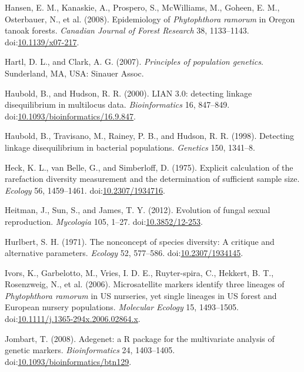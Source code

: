 \documentclass[double,12pt]{beavtex}
\begin{document}
  \hypertarget{ref-hansen2008epidemiology}{}
  Hansen, E. M., Kanaskie, A., Prospero, S., McWilliams, M., Goheen, E.
  M., Osterbauer, N., et al. (2008). Epidemiology of \emph{Phytophthora
  ramorum} in Oregon tanoak forests. \emph{Canadian Journal of Forest
  Research} 38, 1133--1143.
  doi:\href{https://doi.org/10.1139/x07-217}{10.1139/x07-217}.
  
  \hypertarget{ref-hartl1997principles}{}
  Hartl, D. L., and Clark, A. G. (2007). \emph{Principles of population
  genetics}. Sunderland, MA, USA: Sinauer Assoc.
  
  \hypertarget{ref-Haubold:2000}{}
  Haubold, B., and Hudson, R. R. (2000). LIAN 3.0: detecting linkage
  disequilibrium in multilocus data. \emph{Bioinformatics} 16, 847--849.
  doi:\href{https://doi.org/10.1093/bioinformatics/16.9.847}{10.1093/bioinformatics/16.9.847}.
  
  \hypertarget{ref-haubold1998detecting}{}
  Haubold, B., Travisano, M., Rainey, P. B., and Hudson, R. R. (1998).
  Detecting linkage disequilibrium in bacterial populations.
  \emph{Genetics} 150, 1341--8.
  
  \hypertarget{ref-heck1975explicit}{}
  Heck, K. L., van Belle, G., and Simberloff, D. (1975). Explicit
  calculation of the rarefaction diversity measurement and the
  determination of sufficient sample size. \emph{Ecology} 56, 1459--1461.
  doi:\href{https://doi.org/10.2307/1934716}{10.2307/1934716}.
  
  \hypertarget{ref-heitman2012evolution}{}
  Heitman, J., Sun, S., and James, T. Y. (2012). Evolution of fungal
  sexual reproduction. \emph{Mycologia} 105, 1--27.
  doi:\href{https://doi.org/10.3852/12-253}{10.3852/12-253}.
  
  \hypertarget{ref-hurlbert1971nonconcept}{}
  Hurlbert, S. H. (1971). The nonconcept of species diversity: A critique
  and alternative parameters. \emph{Ecology} 52, 577--586.
  doi:\href{https://doi.org/10.2307/1934145}{10.2307/1934145}.
  
  \hypertarget{ref-ivors2006microsatellite}{}
  Ivors, K., Garbelotto, M., Vries, I. D. E., Ruyter-spira, C., Hekkert,
  B. T., Rosenzweig, N., et al. (2006). Microsatellite markers identify
  three lineages of \emph{Phytophthora ramorum} in US nurseries, yet
  single lineages in US forest and European nursery populations.
  \emph{Molecular Ecology} 15, 1493--1505.
  doi:\href{https://doi.org/10.1111/j.1365-294x.2006.02864.x}{10.1111/j.1365-294x.2006.02864.x}.
  
  \hypertarget{ref-Jombart_2008}{}
  Jombart, T. (2008). Adegenet: a R package for the multivariate analysis
  of genetic markers. \emph{Bioinformatics} 24, 1403--1405.
  doi:\href{https://doi.org/10.1093/bioinformatics/btn129}{10.1093/bioinformatics/btn129}.
  
\end{document}

